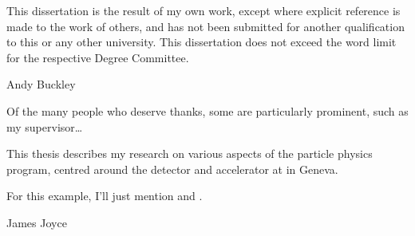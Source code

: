 
\begin{abstract}%
  \LHCb is a \bphysics detector experiment which will take data at
  the \SI{14}{\Hz} \LHC accelerator at \CERN from 2007 onward\dots
\end{abstract}


\begin{declaration}
  This dissertation is the result of my own work, except where explicit
  reference is made to the work of others, and has not been submitted
  for another qualification to this or any other university. This
  dissertation does not exceed the word limit for the respective Degree
  Committee.
  \vspace*{1cm}
  \begin{flushright}
    Andy Buckley
  \end{flushright}
\end{declaration}


\begin{acknowledgements}
  Of the many people who deserve thanks, some are particularly prominent,
  such as my supervisor\dots
\end{acknowledgements}


\begin{preface}
  This thesis describes my research on various aspects of the \LHCb
  particle physics program, centred around the \LHCb detector and \LHC
  accelerator at \CERN in Geneva.

  \noindent
  For this example, I'll just mention 
  and .
\end{preface}

\tableofcontents


%
  {James Joyce}
\thispagestyle{empty}
